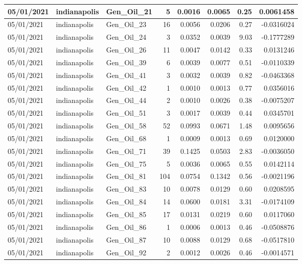 \documentclass[
  letterpaper,
  DIV=11,
  numbers=noendperiod]{scrartcl}
\begin{document}
\begin{tabular}{l|l|l|r|r|r|r|r}
\hline
05/01/2021 & indianapolis & Gen\_Oil\_21 & 5 & 0.0016 & 0.0065 & 0.25 & 0.0061458\\
\hline
05/01/2021 & indianapolis & Gen\_Oil\_23 & 16 & 0.0056 & 0.0206 & 0.27 & -0.0316024\\
\hline
05/01/2021 & indianapolis & Gen\_Oil\_24 & 3 & 0.0352 & 0.0039 & 9.03 & -0.1777289\\
\hline
05/01/2021 & indianapolis & Gen\_Oil\_26 & 11 & 0.0047 & 0.0142 & 0.33 & 0.0131246\\
\hline
05/01/2021 & indianapolis & Gen\_Oil\_39 & 6 & 0.0039 & 0.0077 & 0.51 & -0.0110339\\
\hline
05/01/2021 & indianapolis & Gen\_Oil\_41 & 3 & 0.0032 & 0.0039 & 0.82 & -0.0463368\\
\hline
05/01/2021 & indianapolis & Gen\_Oil\_42 & 1 & 0.0010 & 0.0013 & 0.77 & 0.0356016\\
\hline
05/01/2021 & indianapolis & Gen\_Oil\_44 & 2 & 0.0010 & 0.0026 & 0.38 & -0.0075207\\
\hline
05/01/2021 & indianapolis & Gen\_Oil\_51 & 3 & 0.0017 & 0.0039 & 0.44 & 0.0345701\\
\hline
05/01/2021 & indianapolis & Gen\_Oil\_58 & 52 & 0.0993 & 0.0671 & 1.48 & 0.0095656\\
\hline
05/01/2021 & indianapolis & Gen\_Oil\_68 & 1 & 0.0009 & 0.0013 & 0.69 & 0.0120000\\
\hline
05/01/2021 & indianapolis & Gen\_Oil\_71 & 39 & 0.1425 & 0.0503 & 2.83 & -0.0036050\\
\hline
05/01/2021 & indianapolis & Gen\_Oil\_75 & 5 & 0.0036 & 0.0065 & 0.55 & 0.0142114\\
\hline
05/01/2021 & indianapolis & Gen\_Oil\_81 & 104 & 0.0754 & 0.1342 & 0.56 & -0.0021196\\
\hline
05/01/2021 & indianapolis & Gen\_Oil\_83 & 10 & 0.0078 & 0.0129 & 0.60 & 0.0208595\\
\hline
05/01/2021 & indianapolis & Gen\_Oil\_84 & 14 & 0.0600 & 0.0181 & 3.31 & -0.0174109\\
\hline
05/01/2021 & indianapolis & Gen\_Oil\_85 & 17 & 0.0131 & 0.0219 & 0.60 & 0.0117060\\
\hline
05/01/2021 & indianapolis & Gen\_Oil\_86 & 1 & 0.0006 & 0.0013 & 0.46 & -0.0508876\\
\hline
05/01/2021 & indianapolis & Gen\_Oil\_87 & 10 & 0.0088 & 0.0129 & 0.68 & -0.0517810\\
\hline
05/01/2021 & indianapolis & Gen\_Oil\_92 & 2 & 0.0012 & 0.0026 & 0.46 & -0.0014571\\

\end{tabular}
\end{document}
